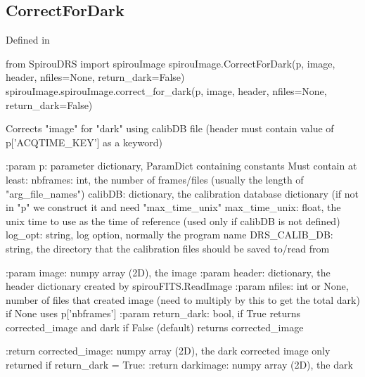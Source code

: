 \noindent\begin{minipage}{\textwidth}
\subsection{CorrectForDark}

Defined in \spirouImage{}

\begin{pythonbox}
from SpirouDRS import spirouImage
spirouImage.CorrectForDark(p, image, header, nfiles=None, return_dark=False)
spirouImage.spirouImage.correct_for_dark(p, image, header, nfiles=None, return_dark=False)
\end{pythonbox}

\begin{pythondocstring}
Corrects "image" for "dark" using calibDB file (header must contain
value of p['ACQTIME_KEY'] as a keyword)

:param p: parameter dictionary, ParamDict containing constants
    Must contain at least:
            nbframes: int, the number of frames/files (usually the length
                      of "arg_file_names")
            calibDB: dictionary, the calibration database dictionary
                     (if not in "p" we construct it and need "max_time_unix"
            max_time_unix: float, the unix time to use as the time of
                            reference (used only if calibDB is not defined)
            log_opt: string, log option, normally the program name
            DRS_CALIB_DB: string, the directory that the calibration
                          files should be saved to/read from

:param image: numpy array (2D), the image
:param header: dictionary, the header dictionary created by
               spirouFITS.ReadImage
:param nfiles: int or None, number of files that created image (need to
               multiply by this to get the total dark) if None uses
               p['nbframes']
:param return_dark: bool, if True returns corrected_image and dark
                    if False (default) returns corrected_image

:return corrected_image: numpy array (2D), the dark corrected image
                         only returned if return_dark = True:
:return darkimage: numpy array (2D), the dark
\end{pythondocstring}
\end{minipage}


